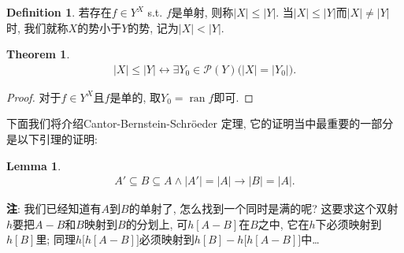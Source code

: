 \documentclass[UTF8,AutoFakeBold]{ctexart}
\theoremstyle{plain}
\newtheorem{theorem}{Theorem}[section] %
\newtheorem{lemma}{Lemma} %
\theoremstyle{definition}
\newtheorem{definition}{Definition}[section] %
\DeclareMathOperator{\ran}{ran}
\begin{document}
\begin{definition}
若存在$f \in Y^X$ s.t. $f$是单射, 则称$|X|\leq |Y|$. 
当$|X|\leq |Y|$而$|X|\neq |Y|$时, 我们就称$X$的势小于$Y$的势, 记为$|X| < |Y|$.
\end{definition}

\begin{theorem}
\begin{align*}
|X| \leq |Y| \leftrightarrow \exists Y_0\in \mathscr P(Y) \big(|X| = |Y_0| \big).
\end{align*}
\end{theorem}
\begin{proof}
对于$f\in Y^X$且$f$是单的, 取$Y_0 = \ran f$即可.
\end{proof}

下面我们将介绍Cantor-Bernstein-Schr\"oeder 定理, 它的证明当中最重要的一部分是以下引理的证明:
\begin{lemma}\label{lemma_CBS}
\begin{align*}
	A'\subseteq B \subseteq A \wedge |A'|=|A| 
		\to |B|=|A|.
\end{align*}
\end{lemma}
\textbf{注}: 我们已经知道有$A$到$B$的单射了, 怎么找到一个同时是满的呢? 
这要求这个双射$h$要把$A-B$和$B$映射到$B$的分划上, 可$h[A-B]$在$B$之中, 它在$h$下必须映射到$h[B]$里; 
同理$h\big\lbrack h[A-B]\big\rbrack$必须映射到$h[B]-h\big\lbrack h[A-B]\big\rbrack$中\ldots
\end{document}
